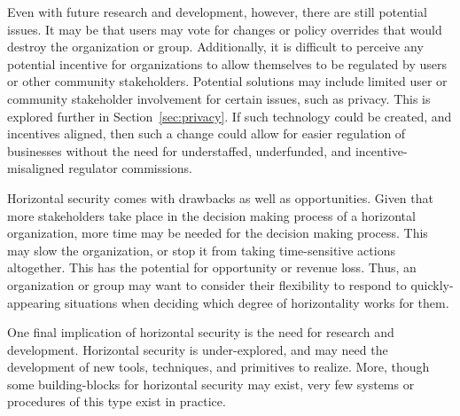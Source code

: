 Even with future research and development, however, there are still potential
issues. It may be that users may vote for changes or policy overrides that would
destroy the organization or group. Additionally, it is difficult to perceive any
potential incentive for organizations to allow themselves to be regulated by
users or other community stakeholders. Potential solutions may include limited
user or community stakeholder involvement for certain issues, such as privacy.
This is explored further in Section~\ref{sec:privacy}. If such technology could
be created, and incentives aligned, then such a change could allow for easier
regulation of businesses without the need for understaffed, underfunded, and
incentive-misaligned regulator commissions.

Horizontal security comes with drawbacks as well as opportunities. Given that
more stakeholders take place in the decision making process of a horizontal
organization, more time may be needed for the decision making process. This
may slow the organization, or stop it from taking time-sensitive actions
altogether. This has the potential for opportunity or revenue loss. Thus, an
organization or group may want to consider their flexibility to respond to
quickly-appearing situations when deciding which degree of horizontality works
for them.

One final implication of horizontal security is the need for research and
development. Horizontal security is under-explored, and may need the development
of new tools, techniques, and primitives to realize. More, though some
building-blocks for horizontal security may exist, very few systems or
procedures of this type exist in practice.
